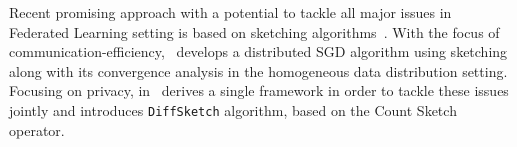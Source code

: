 \documentclass[twoside]{article}
\begin{document}
Recent promising approach with a potential to tackle all major issues in Federated Learning setting is based on sketching algorithms~\cite{DBLP:journals/tcs/CharikarCF04,cormode2005improved,kleinberg2003bursty,Proc:Li_Church_Hastie_NIPS08}. 
With the focus of communication-efficiency,~\cite{ivkin2019communication} develops a distributed SGD algorithm using sketching along with its convergence analysis in the homogeneous data distribution setting. 
Focusing on privacy,  in~\cite{li2019privacy} derives a single framework in order to tackle these issues jointly and introduces \texttt{DiffSketch} algorithm, based on the Count Sketch operator. 
\end{document}
